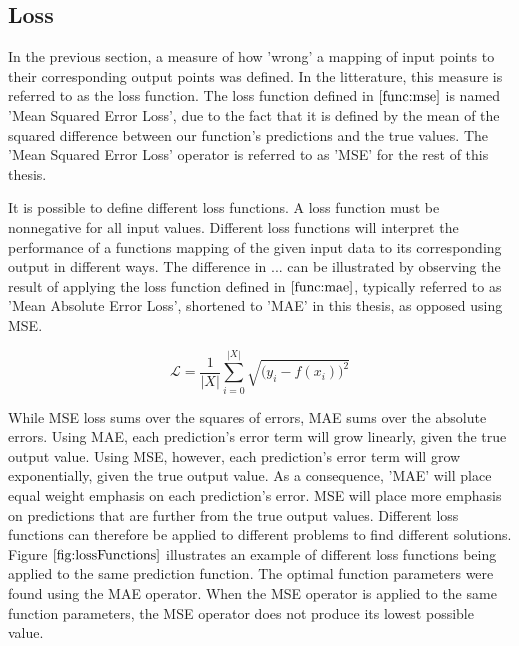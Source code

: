\subsection{Loss}
\label{section:loss}

In the previous section, a measure of how 'wrong' a mapping of input points to their corresponding output points was defined.
In the litterature, this measure is referred to as the loss function. 
The loss function defined in $ \eqref{func:mse} $ is named 'Mean Squared Error Loss', 
due to the fact that it is defined by the mean of the squared difference between our function's predictions and the true values.
The 'Mean Squared Error Loss' operator is referred to as 'MSE' for the rest of this thesis.

It is possible to define different loss functions. A loss function must be nonnegative for all input values.
Different loss functions will interpret the performance of a functions mapping of the given input data to its corresponding output in different ways.
The difference in ... can be illustrated by observing the result of applying the loss function defined in $ \eqref{func:mae} $, typically referred to as 'Mean Absolute Error Loss', shortened to 'MAE' in this thesis, as opposed using MSE.

\[ 
    \mathcal{L} = \frac{1}{|X|}\sum_{i = 0}^{|X|} \sqrt{\big(y_i - f(x_i)\big)^2} \tag{2.4} \label{func:mae} 
\]

While MSE loss sums over the squares of errors, MAE sums over the absolute errors.
Using MAE, each prediction's error term will grow linearly, given the true output value.
Using MSE, however, each prediction's error term will grow exponentially, given the true output value.
As a consequence, 'MAE' will place equal weight emphasis on each prediction's error.
MSE will place more emphasis on predictions that are further from the true output values.
Different loss functions can therefore be applied to different problems to find different solutions. 
Figure $ \eqref{fig:lossFunctions} $ illustrates an example of different loss functions being applied to the same prediction function.
The optimal function parameters were found using the MAE operator. When the MSE operator is applied to the same function parameters,
the MSE operator does not produce its lowest possible value.

